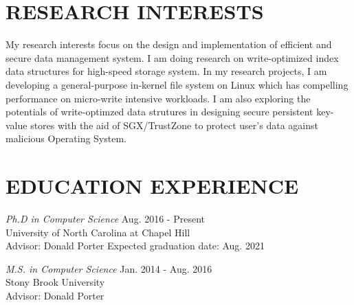 \documentclass[margin, 10pt]{res} %
\begin{document}
\begin{resume}


 
\section{RESEARCH INTERESTS}  
My research interests focus on the design and implementation of efficient and secure data management system.
I am doing research on write-optimized index data structures for high-speed storage system.
In my research projects, I am developing a general-purpose in-kernel file system on Linux which has
compelling performance on micro-write intensive workloads.
I am also exploring the potentials of write-optimzed data strutures in designing
secure persistent key-value stores with the aid of SGX/TrustZone to protect user's data
against malicious Operating System.

%

\section{EDUCATION EXPERIENCE} 

{\sl Ph.D in Computer Science} \hfill Aug. 2016 - Present \\
University of North Carolina at Chapel Hill \\
Advisor: Donald Porter
Expected graduation date: Aug. 2021

{\sl M.S. in Computer Science} \hfill Jan. 2014 - Aug. 2016 \\
Stony Brook University \\
Advisor: Donald Porter


\end{resume}
\end{document}
